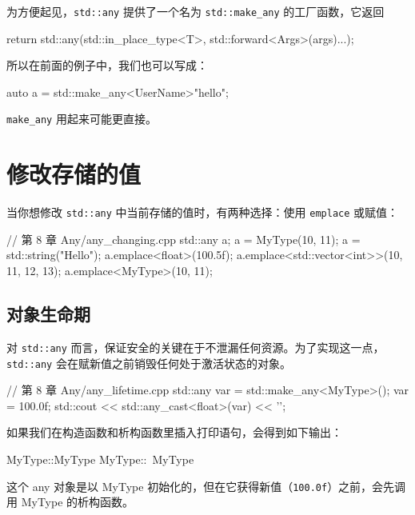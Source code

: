 
为方便起见，\texttt{std::any} 提供了一个名为 \texttt{std::make\_any} 的工厂函数，它返回

\begin{codebox}[cpp]
return std::any(std::in_place_type<T>, std::forward<Args>(args)...);
\end{codebox}

所以在前面的例子中，我们也可以写成：

\begin{codebox}[cpp]
auto a = std::make_any<UserName>{"hello"};
\end{codebox}

\texttt{make\_any} 用起来可能更直接。


\section{修改存储的值}

当你想修改 \texttt{std::any} 中当前存储的值时，有两种选择：使用 \texttt{emplace} 或赋值：

\begin{codebox}[cpp]
// 第 8 章 Any/any_changing.cpp
std::any a;
a = MyType(10, 11);
a = std::string("Hello");
a.emplace<float>(100.5f);
a.emplace<std::vector<int>>({10, 11, 12, 13});
a.emplace<MyType>(10, 11);
\end{codebox}


\subsection{对象生命期}

对 \texttt{std::any} 而言，保证安全的关键在于不泄漏任何资源。为了实现这一点，\texttt{std::any} 会在赋新值之前销毁任何处于激活状态的对象。

\begin{codebox}[cpp]
// 第 8 章 Any/any_lifetime.cpp
std::any var = std::make_any<MyType>();
var = 100.0f;
std::cout << std::any_cast<float>(var) << '\n';
\end{codebox}

如果我们在构造函数和析构函数里插入打印语句，会得到如下输出：

\begin{codebox}[cpp]
MyType::MyType
MyType::~MyType
\end{codebox}

这个 any 对象是以 MyType 初始化的，但在它获得新值（\texttt{100.0f}）之前，会先调用 MyType 的析构函数。


